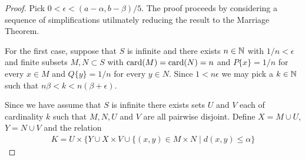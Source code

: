 \begin{proof}
Pick $0 < \epsilon < (a - \alpha, b - \beta)/5$.  The proof proceeds by considering a sequence of simplifications utilmately reducing the result to the Marriage Theorem.

For the first case, suppose that $S$ is infinite and there exists $n \in \mathbb{N}$ with $1/n < \epsilon$ and finite subsets $M, N \subset S$ with $\operatorname*{card}(M) = \operatorname*{card}(N) = n$ and $P \lbrace x \rbrace = 1/n$ for every $x \in M$  and $Q \lbrace y \rbrace = 1/n$ for every $y \in N$.  Since $1 < n \epsilon$ we may pick
a $k \in \mathbb{N}$ such that $n \beta < k < n ( \beta + \epsilon)$.  

Since we have assume that $S$ is infinite there exists sets $U$ and $V$ each of cardinality $k$ such that $M, N, U$ and $V$ are all pairwise disjoint.  Define
$X = M \cup U$, $Y = N \cup V$ and the relation 
\begin{align*}
K = U \times \lbrace Y \cup X \times V \cup \lbrace (x,y) \in M \times N \mid d(x,y) \leq \alpha \rbrace
\end{align*}


\end{proof}
